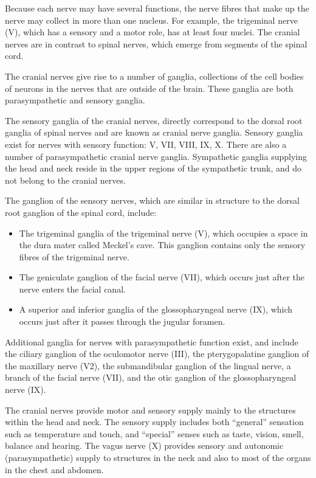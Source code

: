 Because each nerve may have several functions, the nerve fibres that make up the nerve may collect in more than one nucleus. For example, the trigeminal nerve (V), which has a sensory and a motor role, has at least four nuclei.
The cranial nerves are in contrast to spinal nerves, which emerge from segments of the spinal cord.

The cranial nerves give rise to a number of ganglia, collections of the cell bodies of neurons in the nerves that are outside of the brain. These ganglia are both parasympathetic and sensory ganglia.

The sensory ganglia of the cranial nerves, directly correspond to the dorsal root ganglia of spinal nerves and are known as cranial nerve ganglia. Sensory ganglia exist for nerves with sensory function: V, VII, VIII, IX, X. There are also a number of parasympathetic cranial nerve ganglia. Sympathetic ganglia supplying the head and neck reside in the upper regions of the sympathetic trunk, and do not belong to the cranial nerves.

The ganglion of the sensory nerves, which are similar in structure to the dorsal root ganglion of the spinal cord, include:

\begin{itemize}
\tightlist
\item
  The trigeminal ganglia of the trigeminal nerve (V), which occupies a space in the dura mater called Meckel's cave. This ganglion contains only the sensory fibres of the trigeminal nerve.
\item
  The geniculate ganglion of the facial nerve (VII), which occurs just after the nerve enters the facial canal.
\item
  A superior and inferior ganglia of the glossopharyngeal nerve (IX), which occurs just after it passes through the jugular foramen.
\end{itemize}

Additional ganglia for nerves with parasympathetic function exist, and include the ciliary ganglion of the oculomotor nerve (III), the pterygopalatine ganglion of the maxillary nerve (V2), the submandibular ganglion of the lingual nerve, a branch of the facial nerve (VII), and the otic ganglion of the glossopharyngeal nerve (IX).

The cranial nerves provide motor and sensory supply mainly to the structures within the head and neck. The sensory supply includes both ``general'' sensation such as temperature and touch, and ``special'' senses such as taste, vision, smell, balance and hearing. The vagus nerve (X) provides sensory and autonomic (parasympathetic) supply to structures in the neck and also to most of the organs in the chest and abdomen.

